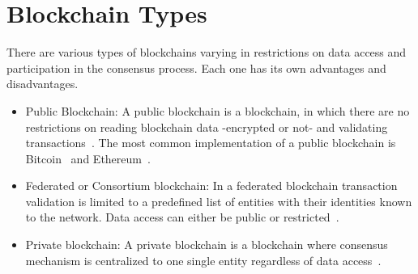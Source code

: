 \begin{table}[]
  \centering
  \caption{Blockchain consensus mechanisms. Adapted and modified from~\cite{bl_consensus,Vukolić2016}}
  \label{table:blockchain_consensus}
\end{table}

\section{Blockchain Types}\label{blockchain:blockchain_types}

There are various types of blockchains varying in restrictions on data access and participation in the consensus process.
Each one has its own advantages and disadvantages.

\begin{itemize}
  \item Public Blockchain: A public blockchain is a blockchain, in which there are no restrictions on reading blockchain data -encrypted or not- and validating transactions~\cite{prbc_vs_pubbc}.
  The most common implementation of a public blockchain is Bitcoin~\cite{nakamoto2012bitcoin} and Ethereum~\cite{ethash}.
  \item Federated or Consortium blockchain: In a federated blockchain transaction validation is limited to a predefined list of entities with their identities known to the network. Data access can either be public or restricted~\cite{prbc_vs_pubbc}.
  \item Private blockchain: A private blockchain is a blockchain where consensus mechanism is centralized to one single entity regardless of data access~\cite{prbc_vs_pubbc}.
\end{itemize}


